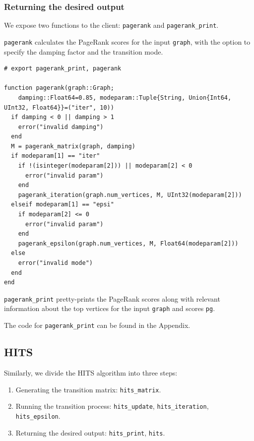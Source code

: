 \documentclass[12pt, titlepage, twoside]{amsart}
\begin{document}
\subsubsection{Returning the desired output}

We expose two functions to the client: \texttt{pagerank} and \texttt{pagerank_print}.

\texttt{pagerank} calculates the PageRank scores for the input \texttt{graph},
with the option to specify the damping factor and the transition mode.

\begin{verbatim}
# export pagerank_print, pagerank

function pagerank(graph::Graph;
    damping::Float64=0.85, modeparam::Tuple{String, Union{Int64, UInt32, Float64}}=("iter", 10))
  if damping < 0 || damping > 1
    error("invalid damping")
  end
  M = pagerank_matrix(graph, damping)
  if modeparam[1] == "iter"
    if !(isinteger(modeparam[2])) || modeparam[2] < 0
      error("invalid param")
    end
    pagerank_iteration(graph.num_vertices, M, UInt32(modeparam[2]))
  elseif modeparam[1] == "epsi"
    if modeparam[2] <= 0
      error("invalid param")
    end
    pagerank_epsilon(graph.num_vertices, M, Float64(modeparam[2]))
  else
    error("invalid mode")
  end
end
\end{verbatim}

\texttt{pagerank_print} pretty-prints the PageRank scores along with relevant information about the top
vertices for the input \texttt{graph} and scores \texttt{pg}.

The code for \texttt{pagerank_print} can be found in the Appendix.

\subsection{HITS}

Similarly, we divide the HITS algorithm into three steps:

\begin{enumerate}
  \item Generating the transition matrix: \texttt{hits_matrix}.
  \item Running the transition process: \texttt{hits_update}, \texttt{hits_iteration},
    \texttt{hits_epsilon}.
  \item Returning the desired output: \texttt{hits_print}, \texttt{hits}.
\end{enumerate}
\end{document}
